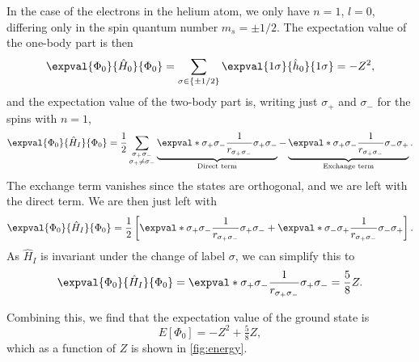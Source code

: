 In the case of the electrons in the helium atom, we only have $n = 1$, $l = 0$, differing only in the spin quantum number $m_s = \pm 1/2$.
The expectation value of the one-body part is then
\begin{equation*}
    \expval{\Phi_0}{\hat{H}_0}{\Phi_0} = \sum_{\sigma \in \{\pm 1/2\}} \expval{1\sigma}{\hat{h}_0}{1\sigma} = -Z^2,
\end{equation*}
and the expectation value of the two-body part is, writing just $\sigma_{+}$ and $\sigma_{-}$ for the spins with $n = 1$,
\begin{equation*}
    \expval{\Phi_0}{\hat{H}_I}{\Phi_0}
    = \frac{1}{2} \sum_{\substack{\sigma_{+}\sigma_{-}\\ \sigma_{+} \neq \sigma_{-}}}
    \underbrace{\expval*{\sigma_{+} \sigma_{-}}{\frac{1}{r_{\sigma_{+}\sigma_{-}}}}{\sigma_{+} \sigma_{-}}}_{\textnormal{Direct term}}
    - \underbrace{\expval*{\sigma_{+} \sigma_{-}}{\frac{1}{r_{\sigma_{+}\sigma_{-}}}}{\sigma_{-}\sigma_{+}}}_{\textnormal{Exchange term}}.
\end{equation*}
The exchange term vanishes since the states are orthogonal, and we are left with the direct term.
We are then just left with
\begin{equation*}
    \expval{\Phi_0}{\hat{H}_I}{\Phi_0} = \frac{1}{2}\left[ \expval*{\sigma_{+} \sigma_{-}}{\frac{1}{r_{\sigma_{+} \sigma_{-}}}}{\sigma_{+} \sigma_{-}} + \expval*{\sigma_{-} \sigma_{+}}{\frac{1}{r_{\sigma_{+} \sigma_{-}}}}{\sigma_{-} \sigma_{+}}\right].
\end{equation*}
As $\hat{H}_I$ is invariant under the change of label $\sigma$, we can simplify this to
\begin{equation*}
    \expval{\Phi_0}{\hat{H}_I}{\Phi_0} = \expval*{\sigma_{+} \sigma_{-}}{\frac{1}{r_{\sigma_{+} \sigma_{-}}}}{\sigma_{+} \sigma_{-}} = \frac{5}{8} Z.
\end{equation*}

Combining this, we find that the expectation value of the ground state is
\begin{equation}
    E[\Phi_0] = -Z^2 + \tfrac{5}{8}Z,
\end{equation}
which as a function of $Z$ is shown in \autoref{fig:energy}.

